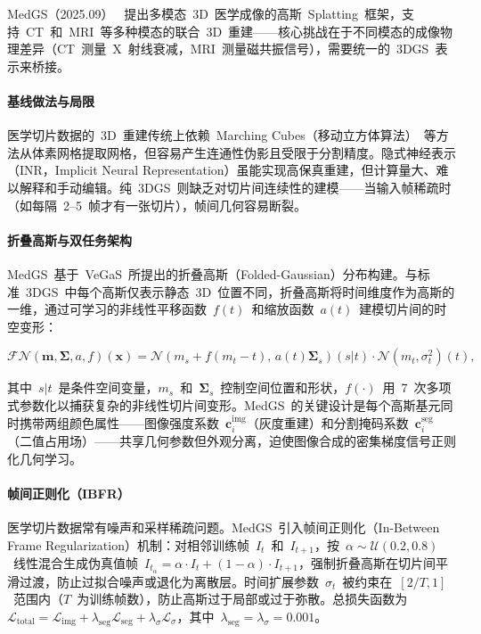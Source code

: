 MedGS（2025.09）~\cite{2509_16806} 提出多模态~3D~医学成像的高斯~Splatting~框架，支持~CT~和~MRI~等多种模态的联合~3D~重建——核心挑战在于不同模态的成像物理差异（CT~测量~X~射线衰减，MRI~测量磁共振信号），需要统一的~3DGS~表示来桥接。

\paragraph{基线做法与局限}
医学切片数据的~3D~重建传统上依赖~Marching Cubes（移动立方体算法）~等方法从体素网格提取网格，但容易产生连通性伪影且受限于分割精度。隐式神经表示（INR，Implicit Neural Representation）虽能实现高保真重建，但计算量大、难以解释和手动编辑。纯~3DGS~则缺乏对切片间连续性的建模——当输入帧稀疏时（如每隔~2--5~帧才有一张切片），帧间几何容易断裂。

\paragraph{折叠高斯与双任务架构}
MedGS~基于~VeGaS~所提出的折叠高斯（Folded-Gaussian）分布构建。与标准~3DGS~中每个高斯仅表示静态~3D~位置不同，折叠高斯将时间维度作为高斯的一维，通过可学习的非线性平移函数~$f(t)$~和缩放函数~$a(t)$~建模切片间的时空变形：

\begin{equation}
\mathcal{FN}(\mathbf{m}, \mathbf{\Sigma}, a, f)(\mathbf{x}) = \mathcal{N}(m_s + f(m_t - t),\, a(t)\mathbf{\Sigma}_s)(s|t) \cdot \mathcal{N}(m_t, \sigma_t^2)(t),
\end{equation}

其中~$s|t$~是条件空间变量，$m_s$~和~$\mathbf{\Sigma}_s$~控制空间位置和形状，$f(\cdot)$~用~7~次多项式参数化以捕获复杂的非线性切片间变形。MedGS~的关键设计是每个高斯基元同时携带两组颜色属性——图像强度系数~$\mathbf{c}_i^{\text{img}}$（灰度重建）和分割掩码系数~$\mathbf{c}_i^{\text{seg}}$（二值占用场）——共享几何参数但外观分离，迫使图像合成的密集梯度信号正则化几何学习。

\paragraph{帧间正则化（IBFR）}
医学切片数据常有噪声和采样稀疏问题。MedGS~引入帧间正则化（In-Between Frame Regularization）机制：对相邻训练帧~$I_t$~和~$I_{t+1}$，按~$\alpha \sim \mathcal{U}(0.2, 0.8)$~线性混合生成伪真值帧~$I_{t_\alpha} = \alpha \cdot I_t + (1-\alpha) \cdot I_{t+1}$，强制折叠高斯在切片间平滑过渡，防止过拟合噪声或退化为离散层。时间扩展参数~$\sigma_t$~被约束在~$[2/T, 1]$~范围内（$T$~为训练帧数），防止高斯过于局部或过于弥散。总损失函数为~$\mathcal{L}_{\text{total}} = \mathcal{L}_{\text{img}} + \lambda_{\text{seg}}\mathcal{L}_{\text{seg}} + \lambda_{\sigma}\mathcal{L}_{\sigma}$，其中~$\lambda_{\text{seg}} = \lambda_{\sigma} = 0.001$。

